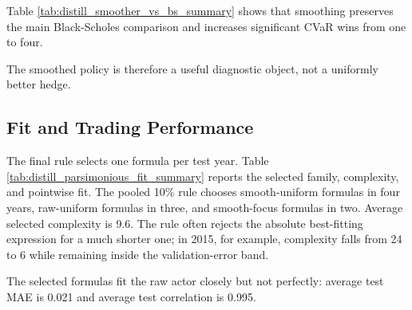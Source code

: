 \documentclass[a4paper,12pt]{article}
\numberwithin{equation}{section}
\begin{document}
Table \ref{tab:distill_smoother_vs_bs_summary} shows that smoothing preserves the main Black-Scholes comparison and increases significant CVaR wins from one to four.

\begin{table}[H]
    \centering
    \caption{Raw and smoothed policies relative to Black-Scholes. Entries are averages across the nine test years. Parentheses report significant favorable/unfavorable years under the two-stage bootstrap. Reward and CVaR entries are policy-minus-Black-Scholes differences; variance entries are log policy-to-Black-Scholes ratios, so negative values are favorable.}
    \label{tab:distill_smoother_vs_bs_summary}
    
\end{table}

The smoothed policy is therefore a useful diagnostic object, not a uniformly better hedge.

\subsection{Fit and Trading Performance}

The final rule selects one formula per test year. Table \ref{tab:distill_parsimonious_fit_summary} reports the selected family, complexity, and pointwise fit. The pooled 10\% rule chooses smooth-uniform formulas in four years, raw-uniform formulas in three, and smooth-focus formulas in two. Average selected complexity is 9.6. The rule often rejects the absolute best-fitting expression for a much shorter one; in 2015, for example, complexity falls from 24 to 6 while remaining inside the validation-error band.

\begin{table}[H]
    \centering
    \caption{Selected symbolic formula family by test year. Complexity is the expression-tree complexity reported by symbolic regression. Validation MAE is measured on the validation-year states against the actually traded raw agent. Test MAE, the 95\% absolute error, and the test correlation are measured on the test-year states against the same raw agent action.}
    \label{tab:distill_parsimonious_fit_summary}
    
\end{table}

The selected formulas fit the raw actor closely but not perfectly: average test MAE is 0.021 and average test correlation is 0.995.

\begin{table}[H]
    \centering
    \caption{Trading performance of the selected symbolic formulas and the raw agent. Entries are averages across the nine test years. Parentheses report significant favorable/unfavorable years under the two-stage bootstrap. Reward and CVaR entries are left-minus-right differences; variance entries are log left-to-right ratios, so negative values are favorable.}
    \label{tab:distill_parsimonious_trading_summary}
    
\end{table}
\end{document}
